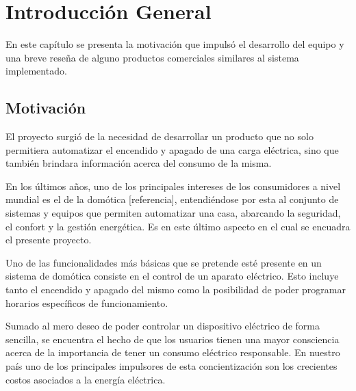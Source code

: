 
\chapter{Introducción General} %

\label{Chapter1} %
\label{IntroGeneral}


\newcommand{\keyword}[1]{\textbf{#1}}
\newcommand{\tabhead}[1]{\textbf{#1}}
\newcommand{\code}[1]{\texttt{#1}}
\newcommand{\file}[1]{\texttt{\bfseries#1}}
\newcommand{\option}[1]{\texttt{\itshape#1}}
\newcommand{\grados}{$^{\circ}$}

En este capítulo se presenta la motivación que impulsó el desarrollo del equipo y una breve reseña de alguno productos comerciales similares al sistema implementado.

\section{Motivación}

El proyecto surgió de la necesidad de desarrollar un producto que no solo permitiera automatizar el encendido y apagado de una carga eléctrica, sino que también brindara información acerca del consumo de la misma.

En los últimos años, uno de los principales intereses de los consumidores a nivel mundial es el de la domótica [referencia], entendiéndose por esta al conjunto de sistemas y equipos que permiten automatizar una casa, abarcando la seguridad, el confort y la gestión energética. Es en este último aspecto en el cual se encuadra el presente proyecto.

Uno de las funcionalidades más básicas que se pretende esté presente en un sistema de domótica consiste en el control de un aparato eléctrico. Esto incluye tanto el encendido y apagado del mismo como la posibilidad de poder programar horarios específicos de funcionamiento.

Sumado al mero deseo de poder controlar un dispositivo eléctrico de forma sencilla, se encuentra el hecho de que los usuarios tienen una mayor consciencia acerca de la importancia de tener un consumo eléctrico responsable. En nuestro país uno de los principales impulsores de esta concientización son los crecientes costos asociados a la energía eléctrica.

